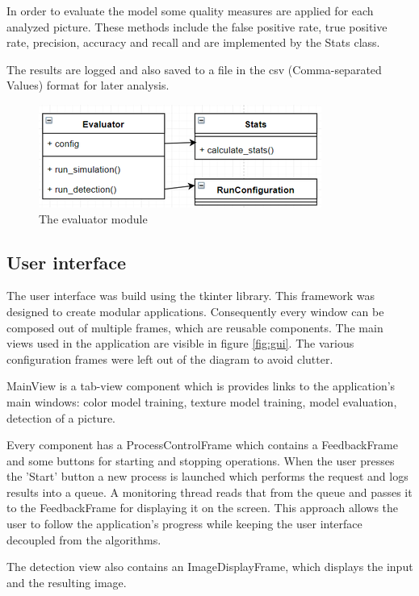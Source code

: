 \documentclass[12pt]{report}
\begin{document}
	In order to evaluate the model some quality measures are applied for each analyzed picture. These methods include the false positive rate, true positive rate, precision, accuracy and recall and are implemented by the Stats class.
	
	The results are logged and also saved to a file in the csv (Comma-separated Values) format for later analysis.
	
	\begin{figure}[h!]
		\centering
		\includegraphics[]{design/evaluator.png}
		\caption{The evaluator module}
		\label{fig:evaluator}
	\end{figure}
	
	\subsection{User interface}
	
	The user interface was build using the tkinter library. This framework was designed to create modular applications. Consequently every window can be composed out of multiple frames, which are reusable components. The main views used in the application are visible in figure \ref{fig:gui}. The various configuration frames were left out of the diagram to avoid clutter.
	
	MainView is a tab-view component which is provides links to the application's main windows: color model training, texture model training, model evaluation, detection of a picture.
	
	Every component has a ProcessControlFrame which contains a FeedbackFrame and some buttons for starting and stopping operations. When the user presses the 'Start' button a new process is launched which performs the request and logs results into a queue. A monitoring thread reads that from the queue and passes it to the FeedbackFrame for displaying it on the screen. This approach allows the user to follow the application's progress while keeping the user interface decoupled from the algorithms.
	
	The detection view also contains an ImageDisplayFrame, which displays the input and the resulting image.
	
\end{document}

